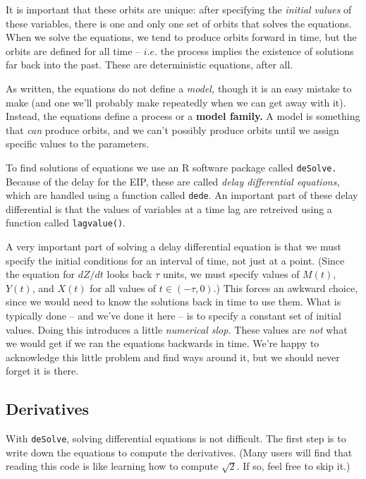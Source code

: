 \documentclass[
]{book}
\begin{document}
It is important that these orbits are unique: after specifying the \emph{initial values} of these variables, there is one and only one set of orbits that solves the equations. When we solve the equations, we tend to produce orbits forward in time, but the orbits are defined for all time -- \(i.e.\) the process implies the existence of solutions far back into the past. These are deterministic equations, after all.

As written, the equations do not define a \emph{model,} though it is an easy mistake to make (and one we'll probably make repeatedly when we can get away with it). Instead, the equations define a process or a \textbf{model family.} A model is something that \emph{can} produce orbits, and we can't possibly produce orbits until we assign specific values to the parameters.

To find solutions of equations we use an R software package called \texttt{deSolve.} Because of the delay for the EIP, these are called \emph{delay differential equations,} which are handled using a function called \texttt{dede}. An important part of these delay differential is that the values of variables at a time lag are retreived using a function called \texttt{lagvalue()}.

A very important part of solving a delay differential equation is that we must specify the initial conditions for an interval of time, not just at a point. (Since the equation for \(dZ/dt\) looks back \(\tau\) units, we must specify values of \(M(t)\), \(Y(t)\), and \(X(t)\) for all values of \(t \in (-\tau, 0)\).) This forces an awkward choice, since we would need to know the solutions back in time to use them. What is typically done -- and we've done it here -- is to specify a constant set of initial values. Doing this introduces a little \emph{numerical slop.} These values are \emph{not} what we would get if we ran the equations backwards in time. We're happy to acknowledge this little problem and find ways around it, but we should never forget it is there.

\hypertarget{derivatives}{%
\subsection{Derivatives}\label{derivatives}}

With \texttt{deSolve}, solving differential equations is not difficult. The first step is to write down the equations to compute the derivatives. (Many users will find that reading this code is like learning how to compute \(\sqrt{2}\). If so, feel free to skip it.)
\end{document}
